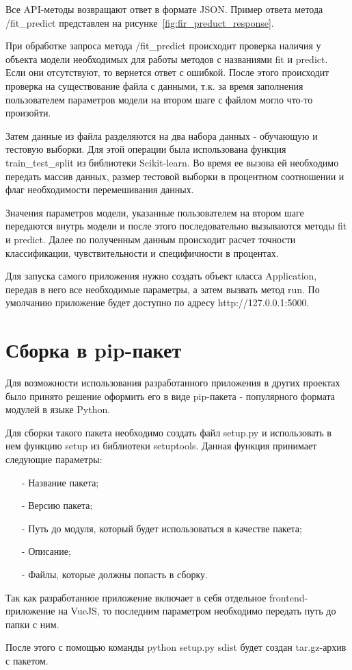Все API-методы возвращают ответ в формате JSON. Пример ответа метода /fit\_predict представлен на рисунке~\ref{fig:fir_preduct_response}.




При обработке запроса метода /fit\_predict происходит проверка наличия у объекта модели необходимых для работы методов с названиями fit и predict. Если они отсутствуют, то вернется ответ с ошибкой. После этого происходит проверка на существование файла с данными, т.к. за время заполнения пользователем параметров модели на втором шаге с файлом могло что-то произойти. 


Затем данные из файла разделяются на два набора данных - обучающую и тестовую выборки. Для этой операции была использована функция train\_test\_split из библиотеки Scikit-learn. Во время ее вызова ей необходимо передать  массив данных, размер тестовой выборки в процентном соотношении и флаг необходимости перемешивания данных. 


Значения параметров модели, указанные пользователем на втором шаге передаются внутрь модели и после этого последовательно вызываются методы fit и predict. Далее по полученным данным происходит расчет точности классификации, чувствительности и специфичности в процентах.


Для запуска самого приложения нужно создать объект класса Application, передав в него все необходимые параметры, а затем вызвать метод run. По умолчанию приложение будет доступно по адресу http://127.0.0.1:5000.

\section{Сборка в pip-пакет}

Для возможности использования разработанного приложения в других проектах было принято решение оформить его в виде pip-пакета - популярного формата модулей в языке Python.


Для сборки такого пакета необходимо создать файл setup.py и использовать в нем функцию setup из библиотеки setuptools. Данная функция принимает следующие параметры:
\begin{itemize}
	\item[-] Название пакета;
	\item[-] Версию пакета;
	\item[-] Путь до модуля, который будет использоваться в качестве пакета;
	\item[-] Описание;
	\item[-] Файлы, которые должны попасть в сборку.
\end{itemize}


Так как разработанное приложение включает в себя отдельное frontend-приложение на VueJS, то последним параметром необходимо передать путь до папки с ним.


После этого с помощью команды python setup.py sdist будет создан tar.gz-архив с пакетом.